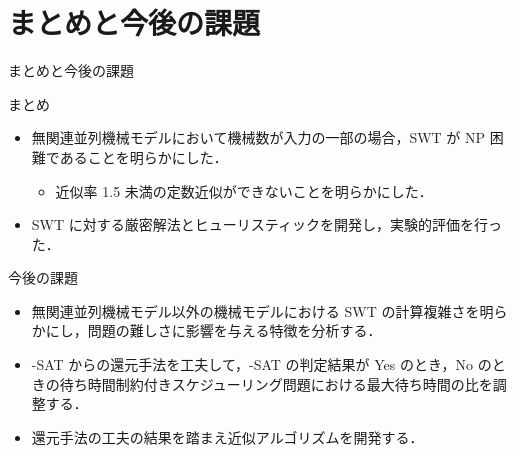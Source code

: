 \documentclass[dvipdfmx]{beamer}
\begin{document}
    \section{まとめと今後の課題}
    \begin{frame}{まとめと今後の課題}
      \begin{block}{まとめ}
        \begin{itemize}
          \item 無関連並列機械モデルにおいて機械数が入力の一部の場合，SWT が NP 困難であることを明らかにした．
          \begin{itemize}
            \item 近似率 1.5 未満の定数近似ができないことを明らかにした．
          \end{itemize}
          \item SWT に対する厳密解法とヒューリスティックを開発し，実験的評価を行った．
        \end{itemize}
      \end{block}
      \begin{alertblock}{今後の課題}
        \begin{itemize}
          \item 無関連並列機械モデル以外の機械モデルにおける SWT の計算複雑さを明らかにし，問題の難しさに影響を与える特徴を分析する．
          \item {-SAT} からの還元手法を工夫して，{-SAT} の判定結果が Yes のとき，No のときの待ち時間制約付きスケジューリング問題における最大待ち時間の比を調整する．
          \item 還元手法の工夫の結果を踏まえ近似アルゴリズムを開発する．
        \end{itemize}
      \end{alertblock}
    \end{frame}
    \begin{frame}

    \end{frame}
\end{document}
